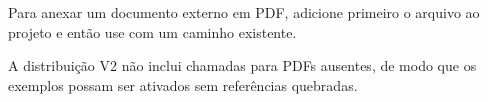 \label{an:documento-pdf}

Para anexar um documento externo em PDF, adicione primeiro o arquivo ao projeto e então use \texttt{\string} com um caminho existente.

A distribuição V2 não inclui chamadas para PDFs ausentes, de modo que os exemplos possam ser ativados sem referências quebradas.
